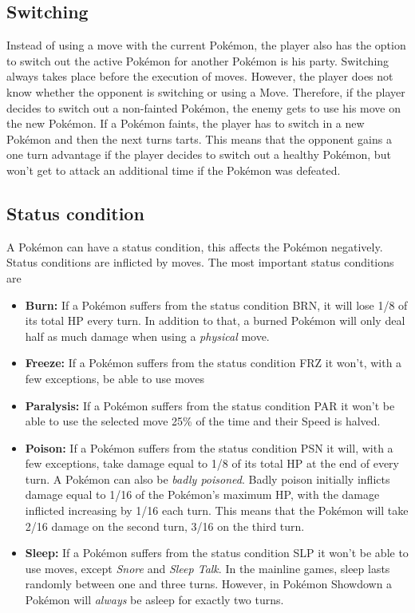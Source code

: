 \subsection{Switching}
\label{sec:switching}
Instead of using a move with the current Pokémon, the player also has the option to switch out the 
active Pokémon for another Pokémon is his party. Switching always takes place before the execution of moves.
However, the player does not know whether the opponent is switching or using a Move. Therefore, if the 
player decides to switch out a non-fainted Pokémon, the enemy gets to use his move on the new Pokémon.
If a Pokémon faints, the player has to switch in a new Pokémon and then the next turns tarts. This means
that the opponent gains a one turn advantage if the player decides to switch out a healthy Pokémon, but
won't get to attack an additional time if the Pokémon was defeated.  

\subsection{Status condition}
A Pokémon can have a status condition, this affects the Pokémon negatively. Status conditions are
inflicted by moves. The most important status conditions are
\begin{itemize}
	\item \textbf{Burn:} If a Pokémon suffers from the status condition \ac{BRN}, it will lose 1/8 of its
		total \ac{HP} every turn. In addition to that, a burned Pokémon will only deal half as much damage
		when using a \textit{physical} move.
	\item \textbf{Freeze:} If a Pokémon suffers from the status condition \ac{FRZ} it won't, with a few exceptions,
		be able to use moves
	\item \textbf{Paralysis:} If a Pokémon suffers from the status condition \ac{PAR} it won't be able to use 
		the selected move 25\% of the time and their Speed is halved.
	\item \textbf{Poison:} If a Pokémon suffers from the status condition \ac{PSN} it will, with a few exceptions,
		take damage equal to 1/8 of its total \ac{HP} at the end of every turn. A Pokémon can also be 
		\textit{badly poisoned}. Badly poison initially inflicts damage equal to 1/16 of the Pokémon's maximum
		\ac{HP}, with the damage inflicted increasing by 1/16 each turn. This means that the Pokémon will
		take 2/16 damage on the second turn, 3/16 on the third turn.
	\item \textbf{Sleep:} If a Pokémon suffers from the status condition \ac{SLP} it won't be able to use moves,
		except \textit{Snore} and \textit{Sleep Talk}. In the mainline games, sleep lasts randomly between
		one and three turns. However, in Pokémon Showdown a Pokémon will \textit{always} be asleep for exactly
		two turns.
\end{itemize}

